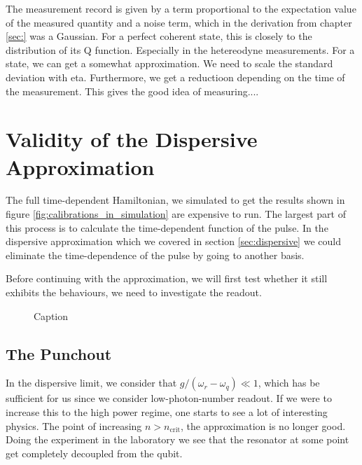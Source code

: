 The measurement record is given by a term proportional to the expectation value of the measured quantity and a noise term, which in the derivation from chapter \ref{sec:} was a Gaussian. For a perfect coherent state, this is closely to the distribution of its Q function. Especially in the hetereodyne measurements. For a state, we can get a somewhat approximation. We need to scale the standard deviation with eta. Furthermore, we get a reductioon depending on the time of the measurement. This gives the good idea of measuring.... 





\section{Validity of the Dispersive Approximation}
The full time-dependent Hamiltonian, we simulated to get the results shown in figure \ref{fig:calibrations_in_simulation} are expensive to run. The largest part of this process is to calculate the time-dependent function of the pulse. In the dispersive approximation which we covered in section \ref{sec:dispersive} we could eliminate the time-dependence of the pulse by going to another basis.

Before continuing with the approximation, we will first test whether it still exhibits the behaviours, we need to investigate the readout. 

\begin{figure}
    \centering
    \incluyde
    \caption{Caption}
    \label{fig:enter-label}
\end{figure}

\subsection{The Punchout}
In the dispersive limit, we consider that $g/(\omega_r - \omega_q) \ll 1$, which has be sufficient for us since we consider low-photon-number readout. If we were to increase this to the high power regime, one starts to see a lot of interesting physics. The point of increasing $n > n_{\text{crit}}$, the approximation is no longer good. Doing the experiment in the laboratory we see that the resonator at some point get completely decoupled from the qubit.

